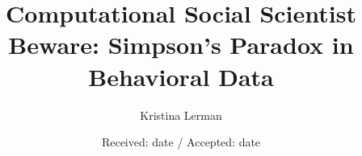 \documentclass{svjour3}
\begin{document}
\title{Computational Social Scientist Beware: Simpson's Paradox in Behavioral Data}

\author{Kristina Lerman}


\date{Received: date / Accepted: date}
\maketitle
\end{document}
